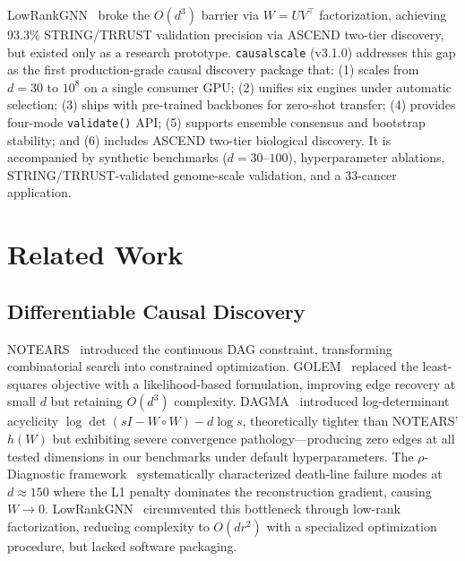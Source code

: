 \documentclass[sigconf,review]{acmart}
\begin{document}
LowRankGNN~\cite{gao2026lowrank} broke the $O(d^3)$ barrier via $W=UV^\top$ factorization, achieving 93.3\% STRING/TRRUST validation precision via ASCEND two-tier discovery, but existed only as a research prototype. \texttt{causalscale} (v3.1.0) addresses this gap as the first production-grade causal discovery package that: (1) scales from $d=30$ to $10^8$ on a single consumer GPU; (2) unifies six engines under automatic selection; (3) ships with pre-trained backbones for zero-shot transfer; (4) provides four-mode \texttt{validate()} API; (5) supports ensemble consensus and bootstrap stability; and (6) includes ASCEND two-tier biological discovery. It is accompanied by synthetic benchmarks ($d=30$--$100$), hyperparameter ablations, STRING/TRRUST-validated genome-scale validation, and a 33-cancer application.

\section{Related Work}

\subsection{Differentiable Causal Discovery}
NOTEARS~\cite{zheng2018dag} introduced the continuous DAG constraint, transforming combinatorial search into constrained optimization. GOLEM~\cite{ng2020golem} replaced the least-squares objective with a likelihood-based formulation, improving edge recovery at small $d$ but retaining $O(d^3)$ complexity. DAGMA~\cite{bello2022dagma} introduced log-determinant acyclicity $\log\det(sI-W\circ W)-d\log s$, theoretically tighter than NOTEARS' $h(W)$ but exhibiting severe convergence pathology---producing zero edges at all tested dimensions in our benchmarks under default hyperparameters. The $\rho$-Diagnostic framework~\cite{gao2025diagnostic} systematically characterized death-line failure modes at $d\approx150$ where the L1 penalty dominates the reconstruction gradient, causing $W\to0$. LowRankGNN~\cite{gao2026lowrank} circumvented this bottleneck through low-rank factorization, reducing complexity to $O(dr^2)$ with a specialized optimization procedure, but lacked software packaging.
\end{document}
